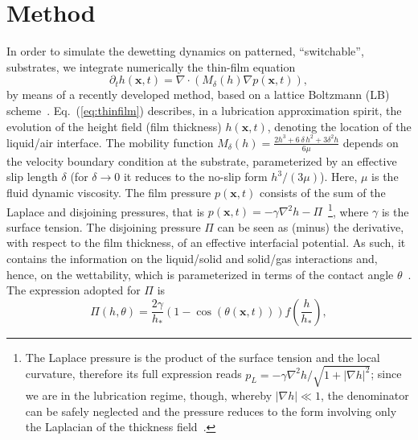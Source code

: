 \section{Method} In order to simulate the dewetting dynamics on patterned, ``switchable'', substrates, we integrate numerically the thin-film equation~\cite{ReynoldsLubr,RevModPhys.69.931,RevModPhys.81.1131} 
\begin{equation}\label{eq:thinfilm}
    \partial_t h(\mathbf{x},t) = \nabla\cdot\left(M_{\delta}(h)\nabla p(\mathbf{x},t)\right),
\end{equation}
by means of a recently developed method, based on a lattice Boltzmann (LB) \\scheme~\cite{PhysRevE.100.033313,PhysRevE.104.034801, Zitz2022}.
Eq.~(\ref{eq:thinfilm}) describes, in a lubrication approximation spirit, the evolution of the height field (film thickness) $h(\mathbf{x},t)$, denoting the location of the liquid/air interface. The mobility function 
$M_{\delta}(h) = \frac{2h^3 + 6\,\delta\, h^2 + 3\delta^2h}{6\mu}$
depends on the velocity boundary condition at the substrate, parameterized by an effective slip length $\delta$
(for $\delta \rightarrow 0$ it reduces to the no-slip form $h^3/(3\mu)$). Here, $\mu$ is the fluid dynamic viscosity.
The film pressure $p(\mathbf{x},t)$ consists of the sum of the Laplace and disjoining pressures, that is $p(\mathbf{x},t) = -\gamma \nabla^2 h - \Pi$~\footnote{The Laplace pressure is the product of the surface tension 
and the local curvature, therefore its full expression reads $p_L = -\gamma \nabla^2 h/\sqrt{1+|\nabla h|^2}$; 
since we are in the lubrication regime, though, whereby $|\nabla h| \ll 1$, the denominator can be safely neglected 
and the pressure reduces to the form involving only the Laplacian of the thickness 
field~\cite{Benet2014,alizadeh_pahlavan_cueto-felgueroso_hosoi_mckinley_juanes_2018}.}, 
where $\gamma$ is the surface tension.
The disjoining pressure $\Pi$ can be seen as (minus) the derivative, with respect to the film thickness, of an effective interfacial potential.
As such, it contains the information on the liquid/solid and solid/gas interactions and, hence, on the wettability, which is parameterized in terms of the contact angle $\theta$~\cite{RevModPhys.81.739, SCHWARTZ1998173}. 
The expression adopted for $\Pi$ is
\begin{equation}\label{eq:disjoinpressure}
\Pi(h,\theta) = \frac{2\gamma}{h_{\ast}}(1-\cos(\theta(\mathbf{x},t)))
  f\left(\frac{h}{h_{\ast}}\right),
\end{equation}
